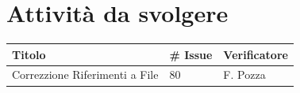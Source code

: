 \documentclass{article}
\begin{document}
\section{Attività da svolgere}
    \begin{center}
        \begin{tabular}{|C{7cm}|C{1,5cm}|C{3cm}|}
            \hline
            \textbf{Titolo} & \textbf{\# Issue} & \textbf{Verificatore} \\
            \hline\hline
            Correzzione Riferimenti a File & 80 & F. Pozza \\
            \hline
        \end{tabular}
    \end{center}
\end{document}
